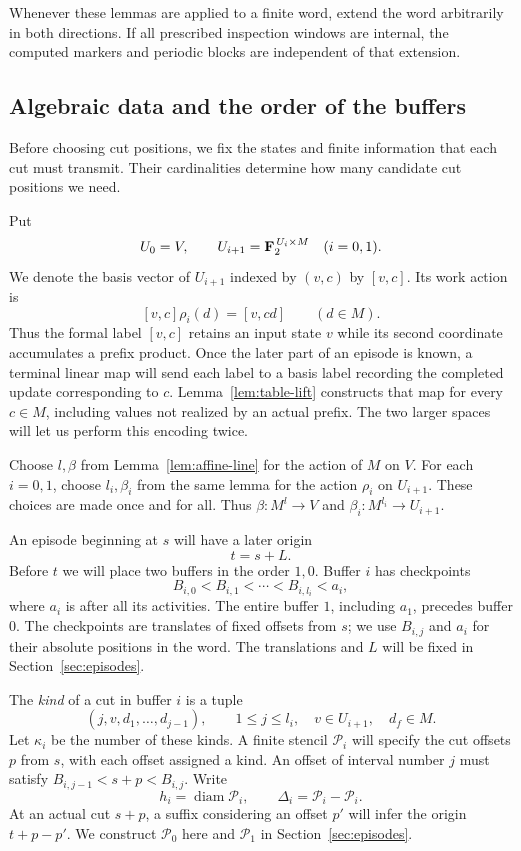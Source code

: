 Whenever these lemmas are applied to a finite word, extend the word
arbitrarily in both directions.  If all prescribed inspection windows
are internal, the computed markers and periodic blocks are independent
of that extension.

\subsection{Algebraic data and the order of the buffers}

Before choosing cut positions, we fix the states and finite information
that each cut must transmit. Their cardinalities determine how many
candidate cut positions we need.

Put
\[
 U_0=V,\qquad U_{i+1}=\mathbf F_2^{\,U_i\times M}\quad (i=0,1).
\]
We denote the basis vector of $U_{i+1}$ indexed by $(v,c)$ by $[v,c]$.
Its work action is
\begin{equation}\label{eq:work-action}
          [v,c]\rho_i(d)=[v,cd]\qquad(d\in M).
\end{equation}
Thus the formal label $[v,c]$ retains an input state $v$ while its
second coordinate accumulates a prefix product. Once the later part of
an episode is known, a terminal linear map will send each label to a
basis label recording the completed update corresponding to $c$.
Lemma~\ref{lem:table-lift} constructs that map for every $c\in M$,
including values not realized by an actual prefix. The two larger spaces
will let us perform this encoding twice.

Choose $l,\beta$ from Lemma~\ref{lem:affine-line} for the action of $M$
on $V$.  For each $i=0,1$, choose $l_i,\beta_i$ from the same lemma for
the action $\rho_i$ on $U_{i+1}$.  These choices are made once and for all.
Thus $\beta:M^l\to V$ and $\beta_i:M^{l_i}\to U_{i+1}$.

An episode beginning at $s$ will have a later origin
\[
                         t=s+L.
\]
Before $t$ we will place two buffers in the order $1,0$.  Buffer $i$
has checkpoints
\[
 B_{i,0}<B_{i,1}<\cdots<B_{i,l_i}<a_i,
\]
where $a_i$ is after all its activities.  The entire buffer $1$,
including $a_1$, precedes buffer $0$.  The checkpoints are translates
of fixed offsets from $s$; we use $B_{i,j}$ and $a_i$ for their absolute
positions in the word.  The translations and $L$ will be fixed in
Section~\ref{sec:episodes}.

The \emph{kind} of a cut in buffer $i$ is a tuple
\begin{equation}\label{eq:buffer-kinds}
 (j,v,d_1,\ldots,d_{j-1}),\qquad
 1\leq j\leq l_i,\quad v\in U_{i+1},\quad d_f\in M.
\end{equation}
Let $\kappa_i$ be the number of these kinds.  A finite stencil
$\mathcal P_i$ will specify the cut offsets $p$ from $s$, with each
offset assigned a kind.  An offset of interval number $j$ must satisfy
$B_{i,j-1}<s+p<B_{i,j}$.  Write
\begin{equation}\label{eq:buffer-differences}
 h_i=\operatorname{diam}\mathcal P_i,\qquad
 \Delta_i=\mathcal P_i-\mathcal P_i.
\end{equation}
At an actual cut $s+p$, a suffix considering an offset $p'$ will infer
the origin $t+p-p'$.  We construct $\mathcal P_0$ here and
$\mathcal P_1$ in Section~\ref{sec:episodes}.

